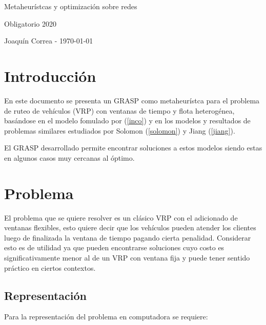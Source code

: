 \documentclass{article}
\begin{document}
  \begin{center}
    {\sc \large Metaheurístcas y optimización sobre redes}
    
    {\sc \large Obligatorio 2020}
    \linebreak

    {\rm Joaquín Correa - \today}
  \end{center}

  \section*{Introducción}

  En este documento se presenta un GRASP como metaheurístca para el problema de ruteo de vehículos (VRP) con ventanas de tiempo y flota heterogénea, basándose en el modelo fomulado por (\ref{inco}) y en los modelos y resultados de problemas similares estudiados por Solomon (\ref{solomon}) y Jiang (\ref{jiang}).

  El GRASP desarrollado permite encontrar soluciones a estos modelos siendo estas en algunos casos muy cercanas al óptimo.

  \section*{Problema}

  El problema que se quiere resolver es un clásico VRP con el adicionado de ventanas flexibles, esto quiere decir que los vehículos pueden atender los clientes luego de finalizada la ventana de tiempo pagando cierta penalidad. Considerar esto es de utilidad ya que pueden encontrarse soluciones cuyo costo es significativamente menor al de un VRP con ventana fija y puede tener sentido práctico en ciertos contextos.

  \subsection*{Representación}

  Para la representación del problema en computadora se requiere:
  
\end{document}
